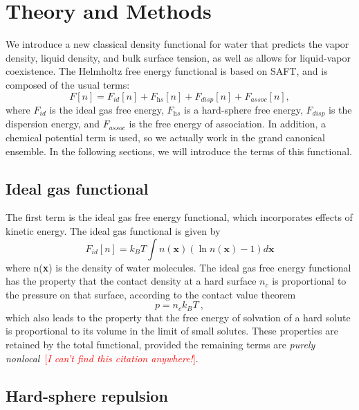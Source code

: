 \documentclass[letterpaper,twocolumn,amsmath,amssymb,prb]{revtex4-1}
\newcommand{\xx}{\textbf{x}}
\newcommand{\needsworknow}[1]{\textcolor{red}{[\emph{#1}]}}
\begin{document}
\section{Theory and Methods}
We introduce a new classical density functional for water that
predicts the vapor density, liquid density, and bulk surface tension, as well 
as allows for liquid-vapor coexistence.  The Helmholtz free energy functional is
based on SAFT, and is composed of the usual terms:
\begin{equation}
  F[n] = F_\textit{id}[n] + F_\textit{hs}[n]  +
F_\textit{disp}[n]+ F_\textit{assoc}[n],
\end{equation}
where $F_\textit{id}$ is the ideal gas free energy, $F_\textit{hs}$ is
a hard-sphere free energy, $F_\textit{disp}$ is the dispersion energy,
and $F_\textit{assoc}$ is the free energy of association.  In
addition, a chemical potential term is used, so we actually work in
the grand canonical ensemble.  In the following sections, we will
introduce the terms of this functional.

\subsection{Ideal gas functional}
The first term is the ideal gas free energy functional,
which incorporates effects of kinetic energy.  The ideal gas
functional is given by
\begin{equation}\label{idealgas}
  F_{id}[n] = k_B T \int n(\xx)\left( \ln{n(\xx)} - 1\right) d\xx
\end{equation}
where n(\xx) is the density of water molecules.  The ideal gas free
energy functional has the property that the contact density at a hard
surface $n_c$ is proportional to the pressure on that surface,
according to the contact value theorem
\begin{equation}\label{contactvaluethm}
  p = n_c k_BT \:,
\end{equation}
which also leads to the property that the free energy of solvation of
a hard solute is proportional to its volume in the limit of small
solutes.  These properties are retained by the total functional,
provided the remaining terms are \emph{purely
  nonlocal}~\cite{ashcroft?}\needsworknow{I can't find this citation anywhere!}.

\subsection{Hard-sphere repulsion}
\end{document}
